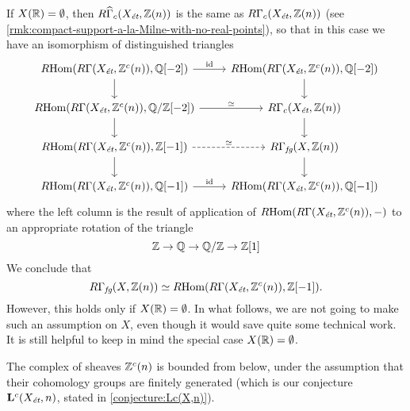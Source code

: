 \begin{remark}
  \label{rmk:RGamma-fg-with-no-real-points}
  If $X (\mathbb{R}) = \emptyset$, then
  $R\widehat{\Gamma}_c (X_\text{\it ét}, \mathbb{Z} (n))$ is the same as
  $R\Gamma_c (X_\text{\it ét}, \mathbb{Z} (n))$
  (see \ref{rmk:compact-support-a-la-Milne-with-no-real-points}), so that in
  this case we have an isomorphism of distinguished triangles
  \[ \begin{tikzcd}
      \RHom (R\Gamma (X_\text{\it ét}, \ZZ^c (n)), \QQ [-2]) \ar{r}{\idid}\ar{d} & \RHom (R\Gamma (X_\text{\it ét}, \ZZ^c (n)), \QQ [-2])\ar{d} \\
      \RHom (R\Gamma (X_\text{\it ét}, \ZZ^c (n)), \QQ/\ZZ [-2]) \ar{r}{\quiso}\ar{d} & R\Gamma_c (X_\text{\it ét}, \ZZ (n))\ar{d} \\
      \RHom (R\Gamma (X_\text{\it ét}, \ZZ^c (n)), \ZZ [-1]) \ar[dashed]{r}{\quiso}\ar{d} & R\Gamma_\text{\it fg} (X, \ZZ (n))\ar{d} \\
      \RHom (R\Gamma (X_\text{\it ét}, \ZZ^c (n)), \QQ [-1]) \ar{r}{\idid} & \RHom (R\Gamma (X_\text{\it ét}, \ZZ^c (n)), \QQ [-1])
    \end{tikzcd} \]
  where the left column is the result of application of
  $R\!\operatorname{Hom} (R\Gamma (X_\text{\it ét}, \mathbb{Z}^c (n)), -)$ to an appropriate rotation
  of the triangle
  $$\mathbb{Z} \to \mathbb{Q} \to \mathbb{Q}/\mathbb{Z} \to \mathbb{Z} [1]$$
  We conclude that
  \[ R\Gamma_\text{\it fg} (X, \mathbb{Z} (n)) \simeq
    R\!\operatorname{Hom} (R\Gamma (X_\text{\it ét}, \mathbb{Z}^c (n)), \mathbb{Z} [-1]). \]
  However, this holds only if $X (\mathbb{R}) = \emptyset$. In what follows, we are not
  going to make such an assumption on $X$, even though it would save quite some
  technical work. It is still helpful to keep in mind the special case
  $X (\mathbb{R}) = \emptyset$.
\end{remark}

The complex of sheaves $\mathbb{Z}^c (n)$ is bounded from below, under the assumption
that their cohomology groups are finitely generated (which is our conjecture
$\mathbf{L}^c (X_\text{\it ét}, n)$, stated in \ref{conjecture:Lc(X,n)}).


